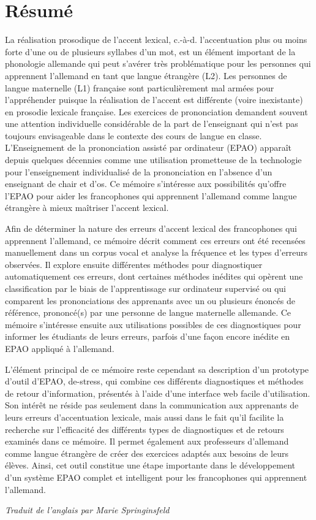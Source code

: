%
\chapter*{Résumé}
\label{sec:abstract:fr}
\vspace*{-10mm}

La réalisation prosodique de l'accent lexical, c.-à-d. l'accentuation plus ou moins forte d'une ou de plusieurs syllabes d'un mot, est un élément important de la phonologie allemande qui peut s'avérer très problématique pour les personnes qui apprennent l'allemand en tant que langue étrangère (L2). Les personnes de langue maternelle (L1) française sont particulièrement mal armées pour l'appréhender puisque la réalisation de l'accent est différente (voire inexistante) en prosodie lexicale française. Les exercices de prononciation demandent souvent une attention individuelle considérable de la part de l'enseignant qui n'est pas toujours envisageable dans le contexte des cours de langue en classe. L'Enseignement de la prononciation assisté par ordinateur (EPAO) apparaît depuis quelques décennies comme une utilisation prometteuse de la technologie pour l'enseignement individualisé de la prononciation en l'absence d'un enseignant de chair et d'os. Ce mémoire s'intéresse aux possibilités qu'offre l'EPAO pour aider les francophones qui apprennent l'allemand comme langue étrangère à mieux maîtriser l'accent lexical.

Afin de déterminer la nature des erreurs d'accent lexical des francophones qui apprennent l'allemand, ce mémoire décrit comment ces erreurs ont été recensées manuellement dans un corpus vocal et analyse la fréquence et les types d'erreurs observées. Il explore ensuite différentes méthodes pour diagnostiquer automatiquement ces erreurs, dont certaines méthodes inédites qui opèrent une classification par le biais de l'apprentissage sur ordinateur supervisé ou qui comparent les prononciations des apprenants avec un ou plusieurs énoncés de référence, prononcé(s) par une personne de langue maternelle allemande. Ce mémoire s'intéresse ensuite aux utilisations possibles de ces diagnostiques pour informer les étudiants de leurs erreurs, parfois d'une façon encore inédite en EPAO appliqué à l'allemand.

L'élément principal de ce mémoire reste cependant sa description d'un prototype d'outil d'EPAO, de-stress, qui combine ces différents diagnostiques et méthodes de retour d'information, présentés à l'aide d'une interface web facile d'utilisation. Son intérêt ne réside pas seulement dans la communication aux apprenants  de leurs erreurs d'accentuation lexicale, mais aussi dans le fait qu'il facilite la recherche sur l'efficacité des différents types de diagnostiques et de retours examinés dans ce mémoire. Il permet également aux professeurs d'allemand comme langue étrangère de créer des exercices adaptés aux besoins de leurs élèves. Ainsi, cet outil constitue une étape importante dans le développement d'un système EPAO complet et intelligent pour les francophones qui apprennent l'allemand.

\begin{flushright}
\textit{Traduit de l'anglais par Marie Springinsfeld}
\end{flushright}